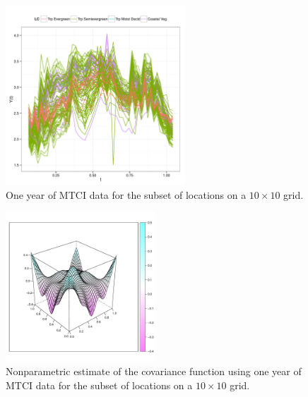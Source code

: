 \begin{figure}[htbp] %
   \centering
   \includegraphics[width=0.6\textwidth]{Images-future-work/region6-curves.pdf} 
   \caption{One year of MTCI data for the subset of locations on a $10\times 10$ grid.}
   \label{fig:region6 curves}
\end{figure}

\begin{figure}
        \centering 
                \includegraphics[width=0.5\textwidth]{Images-future-work/region6-covfit.pdf}
        \caption{Nonparametric estimate of the covariance function using one year of MTCI data for the subset of locations on a $10\times 10$ grid.}
        \label{fig:region6 covfit}
\end{figure}


